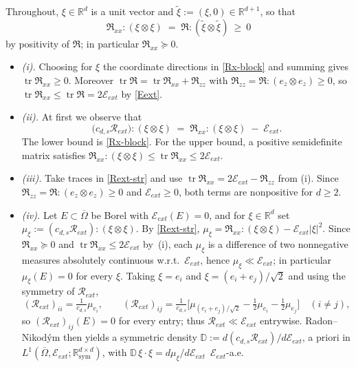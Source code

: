 \documentclass[12pt,a4paper,twoside]{article}
\newcommand{\R}{\mathbb{R}}
\numberwithin{equation}{section}%
\begin{document}
\begin{pf}
	Throughout, $\xi\in\mathbb R^d$ is a unit vector and $\tilde\xi := (\xi,0)\in\mathbb R^{d+1}$, so that
	\begin{equation}\label{Rx-block}
		\mathfrak R_{xx} : (\xi\otimes\xi) \;=\; \mathfrak R : (\tilde\xi\otimes\tilde\xi) \ \ge\ 0
	\end{equation}
	by positivity of $\mathfrak R$; in particular $\mathfrak R_{xx}\succeq0$.
	
	\begin{itemize}[leftmargin=*]
		\item[-] \emph{(i).} Choosing for $\xi$ the coordinate directions in \eqref{Rx-block} and summing gives $\operatorname{tr}\mathfrak R_{xx} \ge 0$. Moreover $\operatorname{tr}\mathfrak R = \operatorname{tr}\mathfrak R_{xx} + \mathfrak R_{zz}$ with $\mathfrak R_{zz} = \mathfrak R : (e_z\otimes e_z) \ge 0$, so $\operatorname{tr}\mathfrak R_{xx}\le\operatorname{tr}\mathfrak R = 2\mathcal E_{ext}$ by \eqref{Eext}.
		\item[-] \emph{(ii).}  At first we observe that
		\[
		\big(c_{d,s}\mathcal R_{ext}\big) : (\xi\otimes\xi) \;=\; \mathfrak R_{xx} : (\xi\otimes\xi) \;-\; \mathcal E_{ext} .
		\]
		The lower bound is \eqref{Rx-block}. For the upper bound, a positive semidefinite matrix satisfies $\mathfrak R_{xx}:(\xi\otimes\xi) \le \operatorname{tr}\mathfrak R_{xx}\le 2\mathcal E_{ext}$. 
		\item[-]\emph{(iii).} Take traces in \eqref{Rext-str} and use $\operatorname{tr}\mathfrak R_{xx} = 2\mathcal E_{ext} - \mathfrak R_{zz}$ from (i). Since $\mathfrak R_{zz}=\mathfrak R:(e_{z}\otimes e_{z})\ge0$ and
		$\mathcal E_{ext}\ge0$, both terms are nonpositive for $d\ge2$.
\item[-]\emph{(iv).} Let $E\subset\overline\Omega$ be Borel with $\mathcal E_{ext}(E)=0$, and for $\xi\in\R^d$
set $\mu_\xi:=(c_{d,s}\mathcal R_{ext}):(\xi\otimes\xi)$. By \eqref{Rext-str},
$\mu_\xi=\mathfrak R_{xx}:(\xi\otimes\xi)-\mathcal E_{ext}|\xi|^2$. Since $\mathfrak R_{xx}\succeq0$ and
$\operatorname{tr}\mathfrak R_{xx}\le2\mathcal E_{ext}$ by~(i), each $\mu_\xi$ is a difference of two
nonnegative measures absolutely continuous w.r.t.\ $\mathcal E_{ext}$, hence $\mu_\xi\ll\mathcal E_{ext}$;
in particular $\mu_\xi(E)=0$ for every $\xi$. Taking $\xi=e_i$ and $\xi=(e_i+e_j)/\sqrt2$ and using
the symmetry of $\mathcal R_{ext}$,
\[
(\mathcal R_{ext})_{ii}=\tfrac1{c_{d,s}}\mu_{e_i},\qquad
(\mathcal R_{ext})_{ij}=\tfrac1{c_{d,s}}\big[\mu_{(e_i+e_j)/\sqrt2}-\tfrac12\mu_{e_i}-\tfrac12\mu_{e_j}\big]
\quad(i\ne j),
\]
so $(\mathcal R_{ext})_{ij}(E)=0$ for every entry; thus $\mathcal R_{ext}\ll\mathcal E_{ext}$ entrywise.
Radon--Nikod\'ym then yields a symmetric density
$\mathbb D:=d(c_{d,s}\mathcal R_{ext})/d\mathcal E_{ext}$, a priori in
$L^1(\overline\Omega,\mathcal E_{ext};\mathbb R^{d\times d}_{\mathrm{sym}})$, with
$\mathbb D\,\xi\cdot\xi=d\mu_\xi/d\mathcal E_{ext}$ $\,\mathcal E_{ext}$-a.e.


\end{itemize}
\end{pf}
\end{document}
